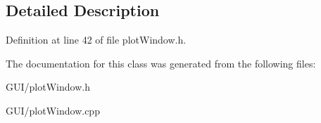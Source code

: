 \subsection{Detailed Description}


Definition at line 42 of file plot\+Window.\+h.



The documentation for this class was generated from the following files\+:\begin{DoxyCompactItemize}
\item 
G\+U\+I/plot\+Window.\+h\item 
G\+U\+I/plot\+Window.\+cpp\end{DoxyCompactItemize}
